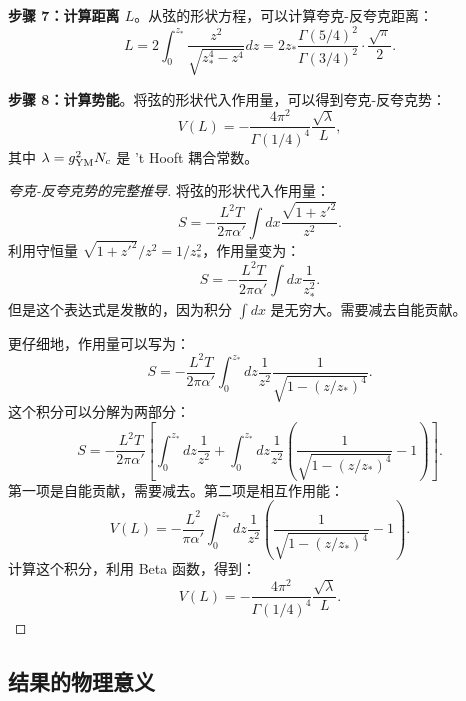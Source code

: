 \textbf{步骤 7：计算距离 $L$}。从弦的形状方程，可以计算夸克-反夸克距离：
\begin{equation}
    L = 2 \int_0^{z_*} \frac{z^2}{\sqrt{z_*^4 - z^4}} dz = 2z_* \frac{\Gamma(5/4)^2}{\Gamma(3/4)^2} \cdot \frac{\sqrt{\pi}}{2}.
\end{equation}

\textbf{步骤 8：计算势能}。将弦的形状代入作用量，可以得到夸克-反夸克势：
\begin{equation}
    V(L) = -\frac{4\pi^2}{\Gamma(1/4)^4} \frac{\sqrt{\lambda}}{L},
\end{equation}
其中 $\lambda = g_{\rm YM}^2 N_c$ 是 't Hooft 耦合常数。

\begin{proof}[夸克-反夸克势的完整推导]
将弦的形状代入作用量：
\begin{equation}
    S = -\frac{L^2 T}{2\pi \alpha'} \int dx \frac{\sqrt{1 + z'^2}}{z^2}.
\end{equation}
利用守恒量 $\sqrt{1 + z'^2}/z^2 = 1/z_*^2$，作用量变为：
\begin{equation}
    S = -\frac{L^2 T}{2\pi \alpha'} \int dx \frac{1}{z_*^2}.
\end{equation}
但是这个表达式是发散的，因为积分 $\int dx$ 是无穷大。需要减去自能贡献。

更仔细地，作用量可以写为：
\begin{equation}
    S = -\frac{L^2 T}{2\pi \alpha'} \int_0^{z_*} dz \frac{1}{z^2} \frac{1}{\sqrt{1 - (z/z_*)^4}}.
\end{equation}
这个积分可以分解为两部分：
\begin{equation}
    S = -\frac{L^2 T}{2\pi \alpha'} \left[ \int_0^{z_*} dz \frac{1}{z^2} + \int_0^{z_*} dz \frac{1}{z^2} \left( \frac{1}{\sqrt{1 - (z/z_*)^4}} - 1 \right) \right].
\end{equation}
第一项是自能贡献，需要减去。第二项是相互作用能：
\begin{equation}
    V(L) = -\frac{L^2}{\pi \alpha'} \int_0^{z_*} dz \frac{1}{z^2} \left( \frac{1}{\sqrt{1 - (z/z_*)^4}} - 1 \right).
\end{equation}
计算这个积分，利用 Beta 函数，得到：
\begin{equation}
    V(L) = -\frac{4\pi^2}{\Gamma(1/4)^4} \frac{\sqrt{\lambda}}{L}.
\end{equation}
\end{proof}

\subsection{结果的物理意义}

